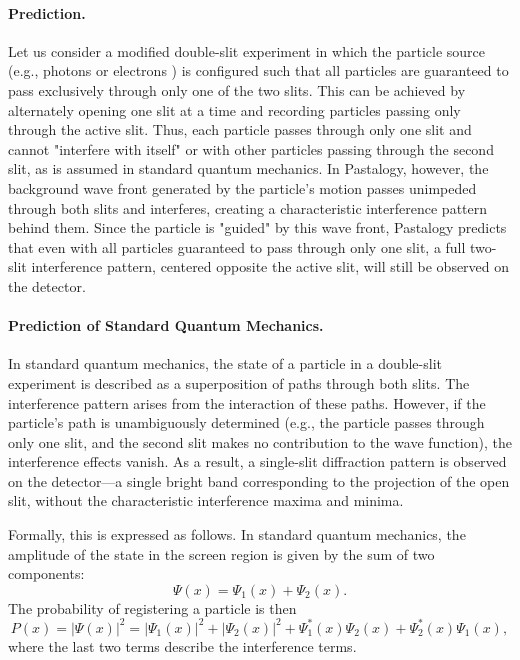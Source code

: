 \documentclass[pdflatex,sn-mathphys-num]{sn-jnl}
\begin{document}
\paragraph{Prediction.} Let us consider a modified double-slit experiment in which the particle source (e.g., photons or electrons \cite{tonomura1989-electron}) is configured such that all particles are guaranteed to pass exclusively through only one of the two slits. This can be achieved by alternately opening one slit at a time and recording particles passing only through the active slit. Thus, each particle passes through only one slit and cannot "interfere with itself" or with other particles passing through the second slit, as is assumed in standard quantum mechanics. In Pastalogy, however, the background wave front generated by the particle's motion passes unimpeded through both slits and interferes, creating a characteristic interference pattern behind them. Since the particle is "guided" by this wave front, Pastalogy predicts that even with all particles guaranteed to pass through only one slit, a full two-slit interference pattern, centered opposite the active slit, will still be observed on the detector.

\paragraph{Prediction of Standard Quantum Mechanics.} In standard quantum mechanics, the state of a particle in a double-slit experiment is described as a superposition of paths through both slits. The interference pattern arises from the interaction of these paths. However, if the particle's path is unambiguously determined (e.g., the particle passes through only one slit, and the second slit makes no contribution to the wave function), the interference effects vanish. As a result, a single-slit diffraction pattern is observed on the detector---a single bright band corresponding to the projection of the open slit, without the characteristic interference maxima and minima.

Formally, this is expressed as follows. In standard quantum mechanics, the amplitude of the state in the screen region is given by the sum of two components:
\begin{equation}
    \Psi(x) = \Psi_1(x) + \Psi_2(x).
\end{equation}
The probability of registering a particle is then
\begin{equation}
    P(x) = |\Psi(x)|^2 = |\Psi_1(x)|^2 + |\Psi_2(x)|^2 + \Psi_1^*(x)\Psi_2(x) + \Psi_2^*(x)\Psi_1(x),
\end{equation}
where the last two terms describe the interference terms.
\end{document}
